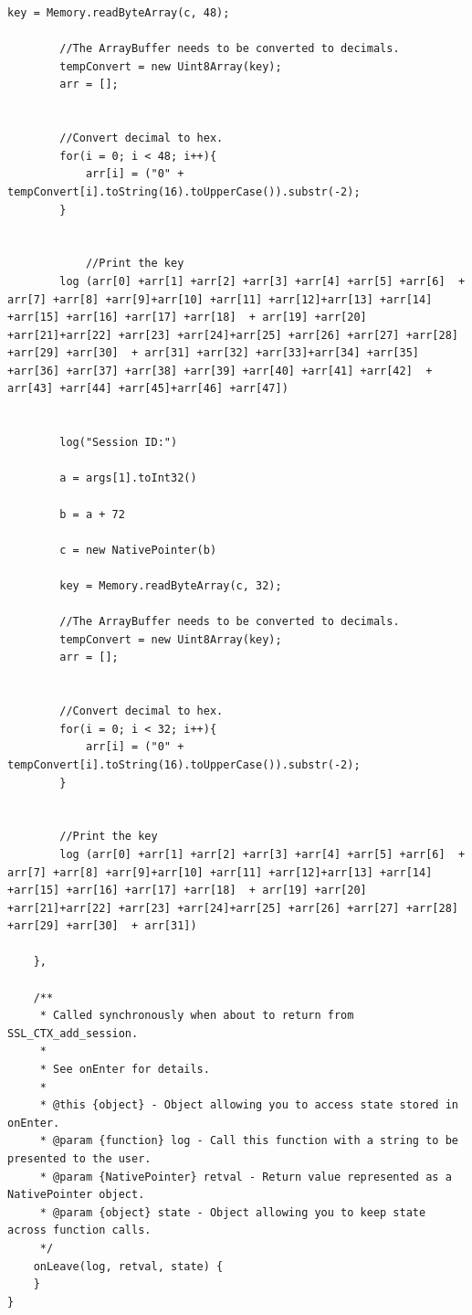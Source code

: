 \documentclass[12pt, a4paper]{report}
\begin{document}
\begin{appendices}
\begin{lstlisting}[frame=single, breaklines=true]
		key = Memory.readByteArray(c, 48);

		//The ArrayBuffer needs to be converted to decimals. 
		tempConvert = new Uint8Array(key);
		arr = [];


		//Convert decimal to hex. 
		for(i = 0; i < 48; i++){
			arr[i] = ("0" + tempConvert[i].toString(16).toUpperCase()).substr(-2);
		}


			//Print the key
		log (arr[0] +arr[1] +arr[2] +arr[3] +arr[4] +arr[5] +arr[6]  + arr[7] +arr[8] +arr[9]+arr[10] +arr[11] +arr[12]+arr[13] +arr[14] +arr[15] +arr[16] +arr[17] +arr[18]  + arr[19] +arr[20] +arr[21]+arr[22] +arr[23] +arr[24]+arr[25] +arr[26] +arr[27] +arr[28] +arr[29] +arr[30]  + arr[31] +arr[32] +arr[33]+arr[34] +arr[35] +arr[36] +arr[37] +arr[38] +arr[39] +arr[40] +arr[41] +arr[42]  + arr[43] +arr[44] +arr[45]+arr[46] +arr[47])


		log("Session ID:")

		a = args[1].toInt32()

		b = a + 72

		c = new NativePointer(b)

		key = Memory.readByteArray(c, 32);

		//The ArrayBuffer needs to be converted to decimals. 
		tempConvert = new Uint8Array(key);
		arr = [];


		//Convert decimal to hex. 
		for(i = 0; i < 32; i++){
			arr[i] = ("0" + tempConvert[i].toString(16).toUpperCase()).substr(-2);
		}


		//Print the key
		log (arr[0] +arr[1] +arr[2] +arr[3] +arr[4] +arr[5] +arr[6]  + arr[7] +arr[8] +arr[9]+arr[10] +arr[11] +arr[12]+arr[13] +arr[14] +arr[15] +arr[16] +arr[17] +arr[18]  + arr[19] +arr[20] +arr[21]+arr[22] +arr[23] +arr[24]+arr[25] +arr[26] +arr[27] +arr[28] +arr[29] +arr[30]  + arr[31])

    },

    /**
     * Called synchronously when about to return from SSL_CTX_add_session.
     *
     * See onEnter for details.
     *
     * @this {object} - Object allowing you to access state stored in onEnter.
     * @param {function} log - Call this function with a string to be presented to the user.
     * @param {NativePointer} retval - Return value represented as a NativePointer object.
     * @param {object} state - Object allowing you to keep state across function calls.
     */
    onLeave(log, retval, state) {
    }
}
\end{lstlisting}







\end{appendices}
\end{document}
